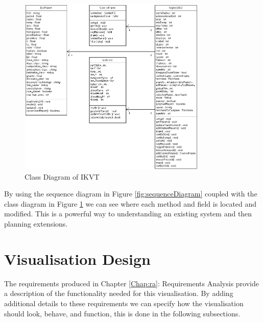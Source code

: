 \begin{enumerate}
\begin{figure}[H]
      \includegraphics[width=0.8\textwidth]{images/classDiagram.png}
  \caption{Class Diagram of IKVT}  
  \label{fig:classDiagram}
\end{figure}
\end{enumerate}

By using
the sequence diagram in Figure \ref{fig:sequenceDiagram} coupled with the class
diagram in Figure \ref{fig:classDiagram} we can see where each method and field
is located and modified. This is a powerful way to understanding an
existing system and then planning extensions.

\section{Visualisation Design}
The requirements produced in Chapter \ref{Chap:ra}: Requirements Analysis
provide a
description of the functionality needed for this
visualisation. By adding additional details to these requirements we can specify
how the visualisation should look, behave, and function, this is done in the following subsections.

\clearpage
